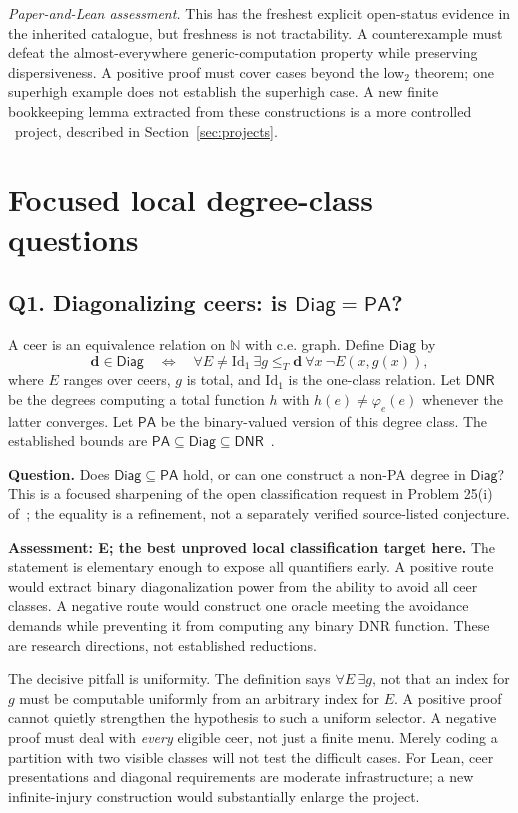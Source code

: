 \documentclass[11pt,a4paper]{article}
\newcommand{\N}{\mathbb N}
\newcommand{\PA}{\mathsf{PA}}\newcommand{\DNR}{\mathsf{DNR}}
\newcommand{\Diag}{\mathsf{Diag}}\newcommand{\IG}{\mathsf{IG}}
\newcommand{\assessment}[1]{\par\noindent\textit{Paper-and-Lean assessment.} #1\par}
\newcommand{\problem}[2]{\subsection{#1. #2}\label{entry:#1}}
\theoremstyle{definition}\newtheorem{definition}[theorem]{Definition}
\theoremstyle{remark}\newtheorem{remark}[theorem]{Remark}
\begin{document}
\assessment{This has the freshest explicit open-status evidence in the inherited catalogue, but freshness is not tractability. A counterexample must defeat the almost-everywhere generic-computation property while preserving dispersiveness. A positive proof must cover cases beyond the low$_2$ theorem; one superhigh example does not establish the superhigh case. A new finite bookkeeping lemma extracted from these constructions is a more controlled \Pmark\ project, described in Section~\ref{sec:projects}.}



\section{Focused local degree-class questions}
\label{sec:oracleclasses}
\problem{Q1}{Diagonalizing ceers: is \texorpdfstring{$\Diag=\PA$}{Diag = PA}?}
A ceer is an equivalence relation on $\N$ with c.e. graph. Define $\Diag$ by
\[
 \mathbf d\in\Diag\quad\Longleftrightarrow\quad
 \forall E\ne\mathrm{Id}_1\ \exists g\leq_T\mathbf d\
 \forall x\ \neg E(x,g(x)),
\]
where $E$ ranges over ceers, $g$ is total, and $\mathrm{Id}_1$ is the
one-class relation. Let $\DNR$ be the degrees computing a total function
$h$ with $h(e)\ne\varphi_e(e)$ whenever the latter converges. Let $\PA$
be the binary-valued version of this degree class. The established bounds are
$\PA\subseteq\Diag\subseteq\DNR$~\cite{Badaev}.

\textbf{Question.} Does $\Diag\subseteq\PA$ hold, or can one construct a
non-PA degree in $\Diag$? This is a focused sharpening of the open
classification request in Problem 25(i) of~\cite{Workshop25}; the equality is a refinement, not a separately verified source-listed conjecture.

\textbf{Assessment: E; the best unproved local classification target here.}
The statement is elementary enough to expose all quantifiers early. A positive
route would extract binary diagonalization power from the ability to avoid
all ceer classes. A negative route would construct one oracle meeting the
avoidance demands while preventing it from computing any binary DNR function.
These are research directions, not established reductions.

The decisive pitfall is uniformity. The definition says
$\forall E\,\exists g$, not that an index for $g$ must be computable uniformly
from an arbitrary index for $E$. A positive proof cannot quietly strengthen
the hypothesis to such a uniform selector. A negative proof must deal with
\emph{every} eligible ceer, not just a finite menu. Merely coding a partition
with two visible classes will not test the difficult cases. For Lean, ceer
presentations and diagonal requirements are moderate infrastructure; a new
infinite-injury construction would substantially enlarge the project.
\end{document}
